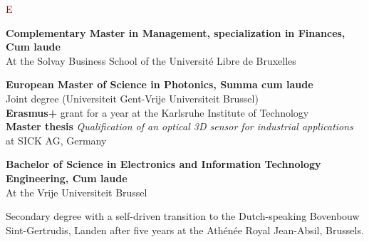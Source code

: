 \documentclass[9pt,a4paper]{article}
\begin{document}
\begin{cv}{}
        \begin{cvlist}{\textcolor{Maroon}{E}}\label{Education}
            \item[2016 $\rightarrow$ 2019 ] \textbf{Complementary Master in Management, specialization in Finances, Cum laude}\\
            At the Solvay Business School of the Universit\'e Libre de Bruxelles
            \item[2014 $\rightarrow$ 2016 ] \textbf{European Master of Science in Photonics, Summa cum laude}\\
            Joint degree (Universiteit Gent-Vrije Universiteit Brussel)\\
            \textbf{Erasmus+} grant for a year at the Karlsruhe Institute of Technology\\
            \textbf{Master thesis} \textit{Qualification of an optical 3D sensor for industrial applications} at SICK AG, Germany
            \item[2011 $\rightarrow$ 2014] \textbf{Bachelor of Science in Electronics and Information Technology Engineering, Cum laude}\\
            At the Vrije Universiteit Brussel
            \item[2005 $\rightarrow$ 2011] Secondary degree with a self-driven transition to the Dutch-speaking Bovenbouw Sint-Gertrudis, Landen after five years at the Ath\'en\'ee Royal Jean-Absil, Brussels.
        \end{cvlist}
        
        

\end{cv}
\end{document}
